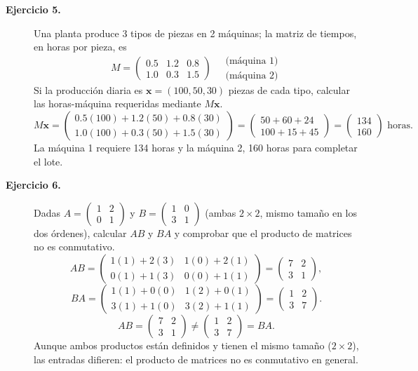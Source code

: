 \documentclass[11pt,letterpaper]{article}
\theoremstyle{definition}
\theoremstyle{plain}
\newcommand{\vv}[1]{\mathbf{#1}}
\begin{document}
\begin{description}
\item[\textbf{Ejercicio 5.}]
Una planta produce 3 tipos de piezas en 2 máquinas; la matriz de tiempos, en horas por pieza, es
\[
  M = \begin{pmatrix}0.5 & 1.2 & 0.8 \\ 1.0 & 0.3 & 1.5\end{pmatrix}
  \quad \begin{array}{l}\text{(máquina 1)}\\\text{(máquina 2)}\end{array}
\]
Si la producción diaria es $\vv{x}=(100,50,30)$ piezas de cada tipo, calcular las horas-máquina
requeridas mediante $M\vv{x}$.
\[
  M\vv{x} = \begin{pmatrix}0.5(100)+1.2(50)+0.8(30)\\1.0(100)+0.3(50)+1.5(30)\end{pmatrix}
  = \begin{pmatrix}50+60+24\\100+15+45\end{pmatrix}
  = \boxed{\begin{pmatrix}134\\160\end{pmatrix}\text{ horas.}}
\]
La máquina 1 requiere 134 horas y la máquina 2, 160 horas para completar el lote.

\item[\textbf{Ejercicio 6.}]
Dadas $A=\begin{pmatrix}1&2\\0&1\end{pmatrix}$ y $B=\begin{pmatrix}1&0\\3&1\end{pmatrix}$
(ambas $2\times 2$, mismo tamaño en los dos órdenes), calcular $AB$ y $BA$ y comprobar que el
producto de matrices no es conmutativo.
\[
  AB = \begin{pmatrix}1(1)+2(3) & 1(0)+2(1)\\0(1)+1(3) & 0(0)+1(1)\end{pmatrix} = \begin{pmatrix}7&2\\3&1\end{pmatrix},
\]
\[
  BA = \begin{pmatrix}1(1)+0(0) & 1(2)+0(1)\\3(1)+1(0) & 3(2)+1(1)\end{pmatrix} = \begin{pmatrix}1&2\\3&7\end{pmatrix}.
\]
\[\boxed{AB=\begin{pmatrix}7&2\\3&1\end{pmatrix} \neq \begin{pmatrix}1&2\\3&7\end{pmatrix}=BA.}\]
Aunque ambos productos están definidos y tienen el mismo tamaño ($2\times 2$), las entradas
difieren: el producto de matrices no es conmutativo en general.

\end{description}
\end{document}
